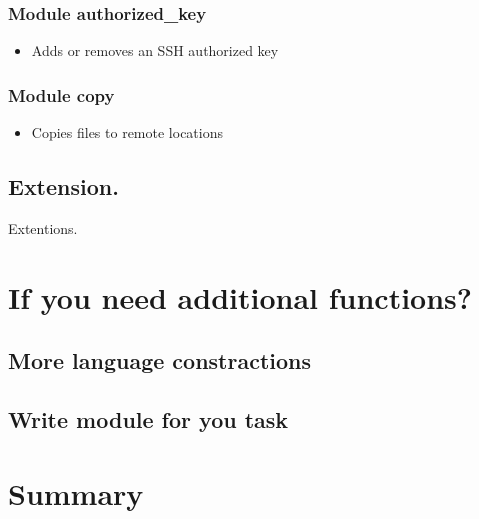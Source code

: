 \documentclass{beamer}
\begin{document}

\begin{frame}[fragile]
\frametitle{Module authorized\_key}
  \begin{itemize}
  \item
  Adds or removes an SSH authorized key
  \end{itemize}
  
\end{frame}

\begin{frame}[fragile]
\frametitle{Module copy}
  \begin{itemize}
  \item
  Copies files to remote locations
  \end{itemize}
  
\end{frame}



\subsection{Extension.}

\begin{frame}{Extentions.}
\end{frame}

\section{If you need additional functions?}
\subsection {More language constractions}
\subsection {Write module for you task}


\section*{Summary}
\end{document}
